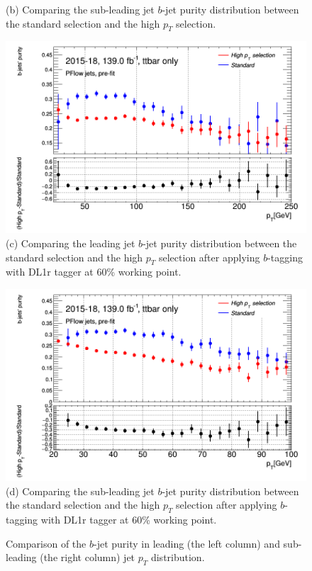\documentclass[letterpaper,12pt]{article}
\begin{document}
\begin{figure}[H]
\begin{minipage}[b]{.45\textwidth}
\footnotesize (b) Comparing the sub-leading jet $b$-jet purity distribution between the standard selection and the high $p_T$ selection.\label{fig:b_after_subleading}
\end{minipage}\hfill
\begin{minipage}[b]{.45\textwidth}
\centering
\includegraphics[width=1\textwidth]{b_purity/tagged_stats_bjets_purityp_Tjet0GeV.png}
\label{b_tagged_leading}
\footnotesize (c) Comparing the leading jet $b$-jet purity distribution between the standard selection and the high $p_T$ selection after applying $b$-tagging with DL1r tagger at 60\% working point.
\end{minipage}\hfill
\begin{minipage}[b]{.45\textwidth}
\centering
\includegraphics[width=1\textwidth]{b_purity/tagged_stats_bjets_purityp_Tjet1GeV.png}
\label{b_tagged_subleading}
\footnotesize (d) Comparing the sub-leading jet $b$-jet purity distribution between the standard selection and the high $p_T$ selection after applying $b$-tagging with DL1r tagger at 60\% working point.
\end{minipage}
\caption{Comparison of the $b$-jet purity in leading (the left column) and sub-leading (the right column) jet $p_{T}$ distribution.}
\label{fig:highpt}
\end{figure}
\end{document}
